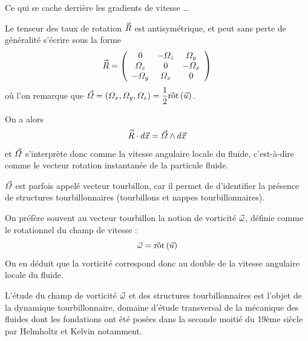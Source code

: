 \begin{frame}{Ce qui se cache derrière les gradients de vitesse \ldots}

\small

Le \textcolor{rouge}{tenseur des taux de rotation $\accentset{\Rightarrow}{R}$} est antisymétrique, et peut sans perte de généralité s'écrire sous la forme 
\[
	\accentset{\Rightarrow}{R} = \left (
	\begin{array}{ccc}
		0 & -\varOmega_z & \varOmega_y
		\\
		\varOmega_z & 0 & -\varOmega_x
		\\
		-\varOmega_y & \varOmega_x & 0
	\end{array}
	\right )
\]
où l'on remarque que $\vec{\varOmega} = (\varOmega_x, \varOmega_y, \varOmega_z) = \displaystyle \frac{1}{2} \vec{\mbox{\rm ro}}\mbox{\rm t}\, (\vec{u})$.

\pause

On a alors
\[
		\accentset{\Rightarrow}{R} \cdot d\vec{x} = \vec{\varOmega} \wedge d\vec{x}	
\]
et $\vec{\varOmega}$ s'interprète donc comme la \textcolor{vert}{vitesse angulaire} locale du fluide, 
c'est-à-dire comme le \textcolor{vert}{vecteur rotation instantanée} de la particule fluide.

\pause

\medskip

$\vec{\varOmega}$ est parfois appelé \textcolor{rouge}{vecteur tourbillon}, car il permet de
d'identifier la présence de structures tourbillonnaires (tourbillons et nappes tourbillonnaires).

\medskip

On préfère souvent au vecteur tourbillon la notion de \textcolor{rouge}{vorticité $\vec{\omega}$}, définie comme le rotationnel du champ de vitesse :
\[
	\vec{\omega} = \vec{\mbox{\rm ro}}\mbox{\rm t}\,(\vec{u})
\]
On en déduit que la vorticité correspond donc au double de la vitesse angulaire locale du fluide.

\medskip

L'étude du champ de vorticité $\vec{\omega}$ et des structures tourbillonnaires est l'objet
de la \textcolor{rouge}{dynamique tourbillonnaire}, domaine d'étude transversal de la mécanique
des fluides dont les fondations ont été posées dans la seconde moitié du 19ème siècle par Helmholtz et Kelvin notamment.

\vspace{0mm}

\end{frame}

